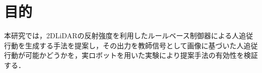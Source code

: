 
\section{目的}

  本研究では，2DLiDARの反射強度を利用したルールベース制御器による人追従行動を生成する手法を提案し，その出力を教師信号として画像に基づいた人追従行動が可能かどうかを，実ロボットを用いた実験により提案手法の有効性を検証する．

\newpage
